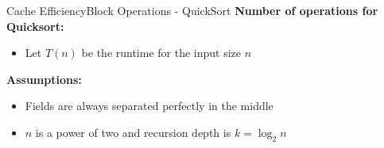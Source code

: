 

\begin{frame}{Cache Efficiency}{Block Operations - QuickSort}
  \textbf{Number of operations for Quicksort:}
  \begin{itemize}
    \item<2->Let {\color{MainA}$T(n)$} be the runtime for the
      {\color{MainA}input size $n$}
  \end{itemize}
  \vspace{1em}
  \textbf{Assumptions:}
  \begin{itemize}
    \item<4->
      Fields are always separated perfectly in the middle
    \item<5->
      {\color{MainA}$n$} is a power of two and recursion depth is
      {\color{MainA}$k = \log_2 n$}
  \end{itemize}
\end{frame}


